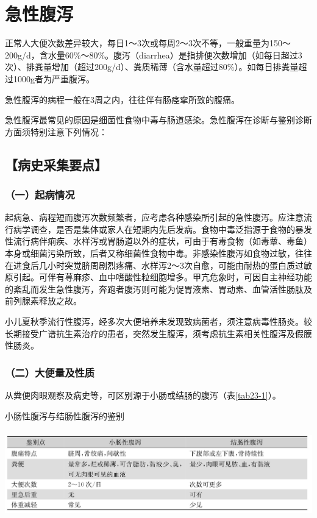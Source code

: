 \chapter{急性腹泻}

正常人大便次数差异较大，每日1～3次或每周2～3次不等，一般重量为150～200g/d，含水量60\%～80\%。腹泻（diarrhea）是指排便次数增加（如每日超过3次）、排粪量增加（超过200g/d）、粪质稀薄（含水量超过80\%）。如每日排粪量超过1000g者为严重腹泻。

急性腹泻的病程一般在3周之内，往往伴有肠痉挛所致的腹痛。

急性腹泻最常见的原因是细菌性食物中毒与肠道感染。急性腹泻在诊断与鉴别诊断方面须特别注意下列情况：

\section{【病史采集要点】}

\subsection{（一）起病情况}

起病急、病程短而腹泻次数频繁者，应考虑各种感染所引起的急性腹泻。应注意流行病学调查，是否是集体或家人在短期内先后发病。食物中毒泛指源于食物的暴发性流行病伴痢疾、水样泻或胃肠道以外的症状，可由于有毒食物（如毒蕈、毒鱼）本身或细菌污染所致，后者又称细菌性食物中毒。非感染性腹泻如食物过敏，往往在进食后几小时突觉脐周剧烈疼痛、水样泻2～3次自愈，可能由耐热的蛋白质过敏原引起。可伴有荨麻疹、血中嗜酸性粒细胞增多。甲亢危象时，可因自主神经功能的紊乱而发生急性腹泻，奔跑者腹泻则可能为促胃液素、胃动素、血管活性肠肽及前列腺素释放之故。

小儿夏秋季流行性腹泻，经多次大便培养未发现致病菌者，须注意病毒性肠炎。较长期接受广谱抗生素治疗的患者，突然发生腹泻，须考虑抗生素相关性腹泻及假膜性肠炎。

\subsection{（二）大便量及性质}

从粪便肉眼观察及病史等，可区别源于小肠或结肠的腹泻（表\ref{tab23-1}）。

\begin{table}[htbp]
\centering
\caption{小肠性腹泻与结肠性腹泻的鉴别}
\label{tab23-1}
\includegraphics[width=5.95833in,height=1.5in]{./images/Image00124.jpg}
\end{table}

